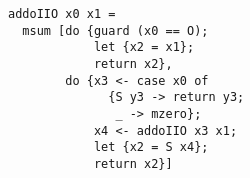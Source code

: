 \begin{figure}[!t]
  \centering
  \begin{minipage}{0.7\columnwidth}
    \begin{lstlisting}[frame=tb]
addoIIO x0 x1 = 
  msum [do {guard (x0 == O);
            let {x2 = x1};
            return x2},
        do {x3 <- case x0 of
              {S y3 -> return y3; 
               _ -> mzero};
            x4 <- addoIIO x3 x1;
            let {x2 = S x4};
            return x2}]
    \end{lstlisting}
  \end{minipage}
\end{figure}
